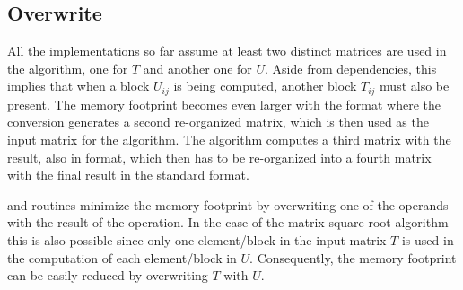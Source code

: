 \documentclass[../thesis]{subfiles}
\begin{document}
	\subsection{Overwrite}
	\label{subsec:mic:optims:overwrite}
	All the implementations so far assume at least two distinct matrices are used in the algorithm, one for $T$ and another one for $U$. Aside from dependencies, this implies that when a block $U_{ij}$ is being computed, another block $T_{ij}$ must also be present. The memory footprint becomes even larger with the \usb format where the conversion generates a second re-organized matrix, which is then used as the input matrix for the algorithm. The algorithm computes a third matrix with the result, also in \usb format, which then has to be re-organized into a fourth matrix with the final result in the standard format.

	\blas and \lapack routines minimize the memory footprint by overwriting one of the operands with the result of the operation. In the case of the matrix square root algorithm this is also possible since only one element/block in the input matrix $T$ is used in the computation of each element/block in $U$. Consequently, the memory footprint can be easily reduced by overwriting $T$ with $U$.
\end{document}
